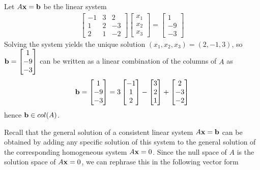 \documentclass[12pt,letterpaper,reqno]{article}
\numberwithin{equation}{section}
\newcommand{\fixme}[1]{{\color{orange}{[#1]}}}
\begin{document}
\begin{example}
	Let $A{\bf x}={\bf b}$ be the linear system
	\begin{align*}
		\begin{bmatrix}
			-1 & 3 & 2 \\ 1 & 2 & -3 \\ 2 & 1 & -2
		\end{bmatrix}\begin{bmatrix}
			x_1 \\ x_2 \\ x_3
		\end{bmatrix}=\begin{bmatrix}
			1 \\ -9 \\ -3
		\end{bmatrix}
	\end{align*}
	Solving the system yields the unique solution $(x_1,x_2,x_3)=(2,-1,3)$, so
${\bf b}=\begin{bmatrix}
	1 \\ -9 \\ -3
\end{bmatrix}$ can be written as a linear combination of the columns of $A$ as 
\begin{align*}
	{\bf b}=\begin{bmatrix}
	1 \\ -9 \\ -3
\end{bmatrix}=3\begin{bmatrix}
	-1\\1\\2
\end{bmatrix}-\begin{bmatrix}
	3\\2\\1
\end{bmatrix}+\begin{bmatrix}
	2\\-3\\-2
\end{bmatrix}
\end{align*}
hence ${\bf b} \in col(A)$.
\end{example}

Recall that the general solution of a consistent linear system $A{\bf x}={\bf b}$ can be obtained by adding any specific solution of this system to the general solution of the corresponding homogeneous system $A{\bf x}=0$. Since the null space of $A$ is the solution space of $A{\bf x}=0$, we can rephrase this in the following vector form \fixme{Need to include this theorem in the appropriate section.}
\end{document}
